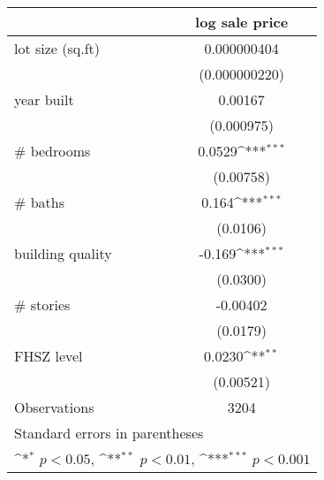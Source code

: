 {
\def\sym#1{\ifmmode^{#1}\else\(^{#1}\)\fi}
\begin{tabular}{l*{1}{c}}
\hline\hline
                    &\multicolumn{1}{c}{log sale price}\\
\hline
lot size (sq.ft)    & 0.000000404         \\
                    &(0.000000220)         \\
[1em]
year built          &     0.00167         \\
                    &  (0.000975)         \\
[1em]
\# bedrooms         &      0.0529\sym{***}\\
                    &   (0.00758)         \\
[1em]
\# baths            &       0.164\sym{***}\\
                    &    (0.0106)         \\
[1em]
building quality    &      -0.169\sym{***}\\
                    &    (0.0300)         \\
[1em]
\# stories          &    -0.00402         \\
                    &    (0.0179)         \\
[1em]
FHSZ level          &      0.0230\sym{**} \\
                    &   (0.00521)         \\
\hline
Observations        &        3204         \\
\hline\hline
\multicolumn{2}{l}{\footnotesize Standard errors in parentheses}\\
\multicolumn{2}{l}{\footnotesize \sym{*} \(p<0.05\), \sym{**} \(p<0.01\), \sym{***} \(p<0.001\)}\\
\end{tabular}
}
